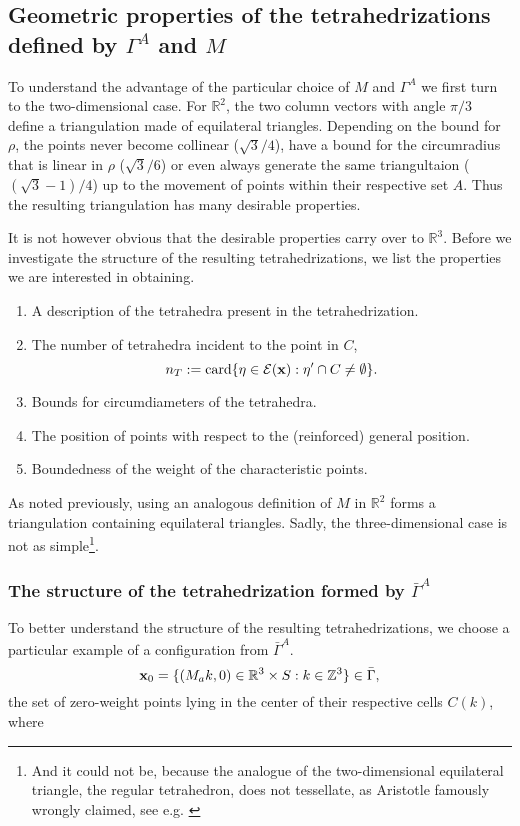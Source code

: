 \subsection{Geometric properties of the tetrahedrizations defined by $\Gamma^A$ and $M$}
To understand the advantage of the particular choice of $M$ and $\Gamma^A$ we first turn to the two-dimensional case. For $\mathbb R^2$, the two column vectors with angle $\pi/3$ define a triangulation made of equilateral triangles. Depending on the bound for $\rho$, the points never become collinear ($\sqrt 3/4$), have a bound for the circumradius that is linear in $\rho$ ($\sqrt 3/6$) or even always generate the same triangultaion ($(\sqrt 3 - 1)/4$) up to the movement of points within their respective set $A$. Thus the resulting triangulation has many desirable properties. \newline

It is not however obvious that the desirable properties carry over to $\mathbb R^3$. Before we investigate the structure of the resulting tetrahedrizations, we list the properties we are interested in obtaining.
\begin{enumerate}
	\item A description of the tetrahedra present in the tetrahedrization.
	\item The number of tetrahedra incident to the point in $C$,  
		$$n_T := \mathrm{card} \{\eta \in \mathcal E({\mathbf{x}}): \eta' \cap C \neq \emptyset\}.$$
	\item Bounds for circumdiameters of the tetrahedra.
	\item The position of points with respect to the (reinforced) general position.  
	\item Boundedness of the weight of the characteristic points.
\end{enumerate}

As noted previously, using an analogous definition of $M$ in $\mathbb R^2$ forms a triangulation containing equilateral triangles. Sadly, the three-dimensional case is not as simple\footnote{And it could not be, because the analogue of the two-dimensional equilateral triangle, the regular tetrahedron, does not tessellate, as Aristotle famously wrongly claimed, see e.g. \cite{Lagarias12}}.

\subsubsection{The structure of the tetrahedrization formed by $\bar\Gamma^A$}
To better understand the structure of the resulting tetrahedrizations, we choose a particular example of a configuration from $\bar\Gamma^A$. 
$${\mathbf{x}}_0 = \{(M_ak,0) \in {\mathbb R^3}\times S: k \in \mathbb Z^3\} \in \bar\Gamma,$$ 
the set of zero-weight points lying in the center of their respective cells $C(k)$, where

